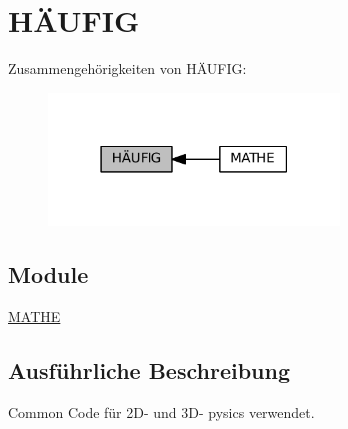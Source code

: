 \hypertarget{group__H_xC3_x84UFIG}{}\section{HÄ\+U\+F\+IG}
\label{group__H_xC3_x84UFIG}
Zusammengehörigkeiten von HÄ\+U\+F\+IG\+:\nopagebreak
\begin{figure}[H]
\begin{center}
\leavevmode
\includegraphics[width=219pt]{group__H_xC3_x84UFIG}
\end{center}
\end{figure}
\subsection*{Module}
\begin{DoxyCompactItemize}
\item 
\hyperlink{group__MATHE}{M\+A\+T\+HE}
\end{DoxyCompactItemize}


\subsection{Ausführliche Beschreibung}
Common Code für 2\+D-\/ und 3\+D-\/ pysics verwendet. 